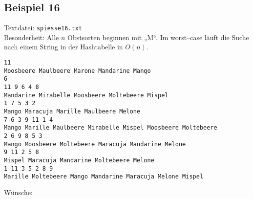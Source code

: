 \newpage
\subsection{Beispiel 16}\label{example:16}
Textdatei: \texttt{spiesse16.txt}\\
Besonderheit: Alle $n$ Obstsorten beginnen mit „M“. Im worst--case läuft die Suche nach einem String in der Hashtabelle in $O(n)$.
\begin{verbatim}
11
Moosbeere Maulbeere Marone Mandarine Mango
6
11 9 6 4 8
Mandarine Mirabelle Moosbeere Moltebeere Mispel
1 7 5 3 2
Mango Maracuja Marille Maulbeere Melone
7 6 3 9 11 1 4
Mango Marille Maulbeere Mirabelle Mispel Moosbeere Moltebeere
2 6 9 8 5 3
Mango Moosbeere Moltebeere Maracuja Mandarine Melone
9 11 2 5 8
Mispel Maracuja Mandarine Moltebeere Melone
1 11 3 5 2 8 9
Marille Moltebeere Mango Mandarine Maracuja Melone Mispel
\end{verbatim}

\noindent
Wünsche: 
\vspace{0.25cm}

\noindent
{}
